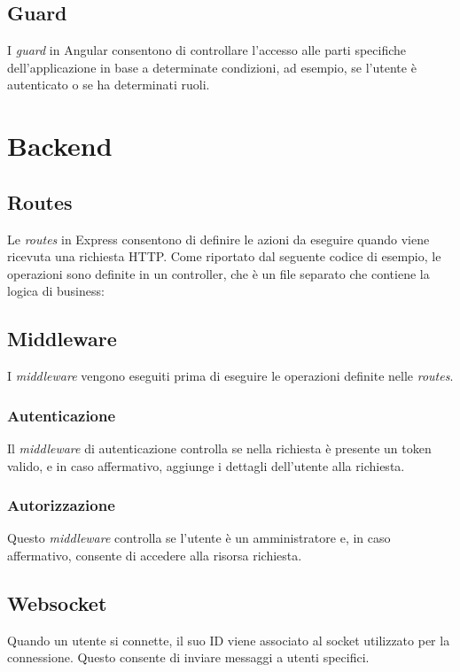 

\subsection{Guard}

I \textit{guard} in Angular consentono di controllare l'accesso alle parti specifiche dell'applicazione in base a determinate condizioni, ad esempio, se l'utente è autenticato o se ha determinati ruoli.



\section{Backend}

\subsection{Routes}
Le \textit{routes} in Express consentono di definire le azioni da eseguire quando viene ricevuta una richiesta HTTP.
Come riportato dal seguente codice di esempio, le operazioni sono definite in un controller, che è un file separato che contiene la logica di business:


\subsection{Middleware}
I \textit{middleware} vengono eseguiti prima di eseguire le operazioni definite nelle \textit{routes}.

\subsubsection{Autenticazione}



Il \textit{middleware} di autenticazione controlla se nella richiesta è presente un token valido, e in caso affermativo, aggiunge i dettagli dell'utente alla richiesta.

\subsubsection{Autorizzazione}



Questo \textit{middleware} controlla se l'utente è un amministratore e, in caso affermativo, consente di accedere alla risorsa richiesta.

\subsection{Websocket}
Quando un utente si connette, il suo ID viene associato al socket utilizzato per la connessione. Questo consente di inviare messaggi a utenti specifici.



